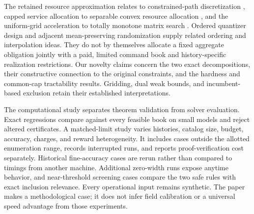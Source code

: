 The retained resource approximation relates to constrained-path discretization \citep{Hassin1992,LorenzRaz2001}, capped service allocation to separable convex resource allocation \citep{Patriksson2008}, and the uniform-grid acceleration to totally monotone matrix search \citep{Aggarwal1987}. Ordered quantizer design \citep{Wu1991} and adjacent mean-preserving randomization \citep{PagesWilbertz2012} supply related ordering and interpolation ideas. They do not by themselves allocate a fixed aggregate obligation jointly with a paid, limited command book and history-specific realization restrictions. Our novelty claims concern the two exact decompositions, their constructive connection to the original constraints, and the hardness and common-cap tractability results. Gridding, dual weak bounds, and incumbent-based exclusion retain their established interpretations.

The computational study separates theorem validation from solver evaluation. Exact regressions compare against every feasible book on small models and reject altered certificates. A matched-limit study varies histories, catalog size, budget, accuracy, charges, and reward heterogeneity. It includes cases outside the allotted enumeration range, records interrupted runs, and reports proof-verification cost separately. Historical fine-accuracy cases are rerun rather than compared to timings from another machine. Additional zero-width runs expose anytime behavior, and near-threshold screening cases compare the two safe rules with exact inclusion relevance. Every operational input remains synthetic. The paper makes a methodological case; it does not infer field calibration or a universal speed advantage from those experiments.

